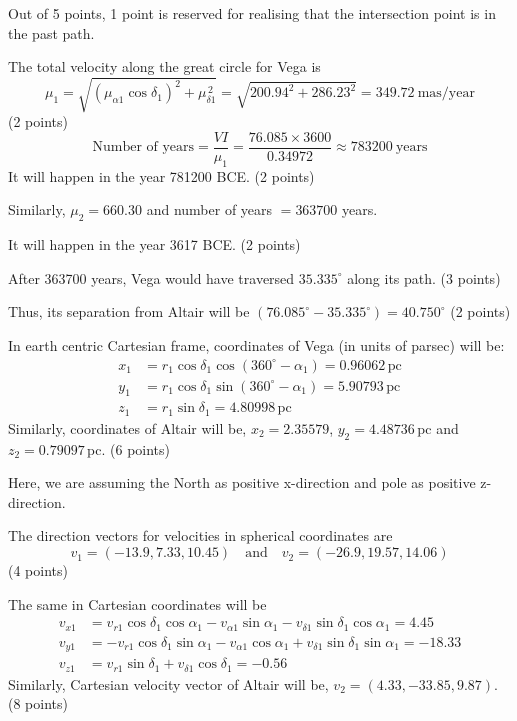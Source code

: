 \begin{description}
  Out of 5 points, 1 point is reserved for realising that the intersection
  point is in the past path.

\item[(f)] The total velocity along the great circle for Vega is
  \[ \mu_1 = \sqrt{(\mu_{\alpha 1}\cos\delta_1)^2 + \mu_{\delta 1}^{\,2}}
     = \sqrt{200.94^2 + 286.23^2} = 349.72\ \text{mas/year} \]
  \hfill(2 points)
  \[ \text{Number of years} = \frac{VI}{\mu_1}
     = \frac{76.085\times 3600}{0.34972} \approx 783200\ \text{years} \]
  It will happen in the year 781200 BCE. \hfill(2 points)

  Similarly, $\mu_2 = 660.30$ and number of years $= 363700$ years.

  It will happen in the year 3617 BCE.
  \hfill(2 points)

\item[(g)] After 363700 years, Vega would have traversed $35.335^\circ$
  along its path. \hfill(3 points)

  Thus, its separation from Altair will be
  $(76.085^\circ - 35.335^\circ) = 40.750^\circ$ \hfill(2 points)

\item[(h)] In earth centric Cartesian frame, coordinates of Vega (in units
  of parsec) will be:
  \begin{align*}
  x_1 &= r_1\cos\delta_1\cos(360^\circ - \alpha_1) = 0.96062\,\text{pc}\\
  y_1 &= r_1\cos\delta_1\sin(360^\circ - \alpha_1) = 5.90793\,\text{pc}\\
  z_1 &= r_1\sin\delta_1 = 4.80998\,\text{pc}
  \end{align*}
  Similarly, coordinates of Altair will be, $x_2 = 2.35579$,
  $y_2 = 4.48736$\,pc and $z_2 = 0.79097$\,pc. \hfill(6 points)

  Here, we are assuming the North as positive x-direction and pole as
  positive z-direction.

  The direction vectors for velocities in spherical coordinates are
  \[ v_1 = (-13.9, 7.33, 10.45)\quad\text{and}\quad
     v_2 = (-26.9, 19.57, 14.06) \]
  \hfill(4 points)

  The same in Cartesian coordinates will be
  \begin{align*}
  v_{x1} &= v_{r1}\cos\delta_1\cos\alpha_1 - v_{\alpha 1}\sin\alpha_1
    - v_{\delta 1}\sin\delta_1\cos\alpha_1 = 4.45\\
  v_{y1} &= -v_{r1}\cos\delta_1\sin\alpha_1 - v_{\alpha 1}\cos\alpha_1
    + v_{\delta 1}\sin\delta_1\sin\alpha_1 = -18.33\\
  v_{z1} &= v_{r1}\sin\delta_1 + v_{\delta 1}\cos\delta_1 = -0.56
  \end{align*}
  Similarly, Cartesian velocity vector of Altair will be,
  $v_2 = (4.33, -33.85, 9.87)$. \hfill(8 points)


\end{description}
